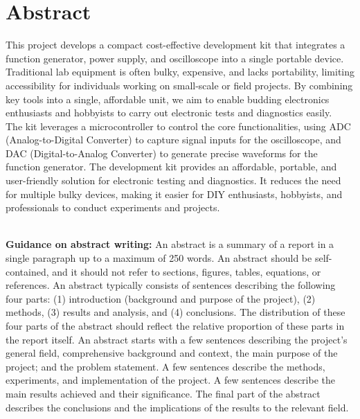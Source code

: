 \chapter*{\center \Large  Abstract}

This project develops a compact cost-effective development kit that integrates a function generator, power supply, and oscilloscope into a single portable device. Traditional lab equipment is often bulky, expensive, and lacks portability, limiting accessibility for individuals working on small-scale or field projects. By combining key tools into a single, affordable unit, we aim to enable budding electronics enthusiasts and hobbyists to carry out electronic tests and diagnostics easily.\\
The kit leverages a microcontroller to control the core functionalities, using ADC (Analog-to-Digital Converter) to capture signal inputs for the oscilloscope, and DAC (Digital-to-Analog Converter) to generate precise waveforms for the function generator. The development kit provides an affordable, portable, and user-friendly solution for electronic testing and diagnostics. It reduces the need for multiple bulky devices, making it easier for DIY enthusiasts, hobbyists, and professionals to conduct experiments and projects.

~\\[1cm]%
\noindent\textbf{Guidance on abstract writing:} An abstract is a summary of a report in a single paragraph up to a maximum of 250 words. An abstract should be self-contained, and it should not refer to sections, figures, tables, equations, or references. An abstract typically consists of sentences describing the following four parts: (1) introduction (background and purpose of the project), (2) methods, (3) results and analysis, and (4) conclusions. The distribution of these four parts of the abstract should reflect the relative proportion of these parts in the report itself. An abstract starts with a few sentences describing the project's general field, comprehensive background and context, the main purpose of the project; and the problem statement. A few sentences describe the methods, experiments, and implementation of the project. A few sentences describe the main results achieved and their significance. The final part of the abstract describes the conclusions and the implications of the results to the relevant field.


